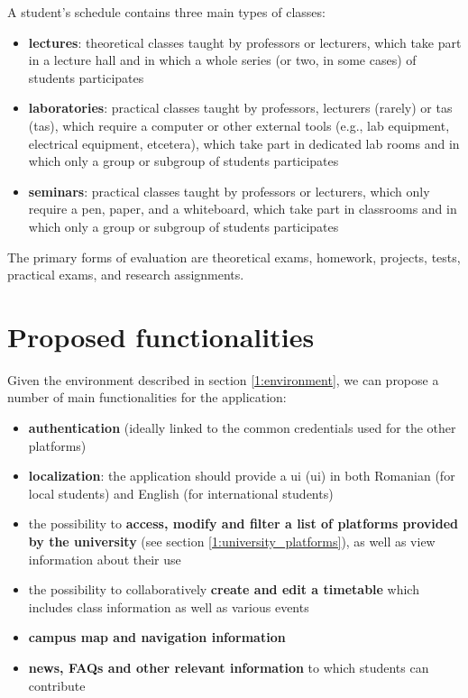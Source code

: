     A student's schedule contains three main types of classes:
    
    \begin{itemize}
        \setlength{\topsep}{0.5pt}
        \setlength{\itemsep}{0.5pt}
        \setlength{\parsep}{0.5pt}
        \item \textbf{lectures}: theoretical classes taught by professors or lecturers, which take part in a lecture hall and in which a whole series (or two, in some cases) of students participates
        \item \textbf{laboratories}: practical classes taught by professors, lecturers (rarely) or \acrshort{ta}s (\acrlong{ta}s), which require a computer or other external tools (e.g., lab equipment, electrical equipment, etcetera), which take part in dedicated lab rooms and in which only a group or subgroup of students participates
        \item \textbf{seminars}: practical classes taught by professors or lecturers, which only require a pen, paper, and a whiteboard, which take part in classrooms and in which only a group or subgroup of students participates
    \end{itemize}
    
    The primary forms of evaluation are theoretical exams, homework, projects, tests, practical exams, and research assignments.
        
\section{Proposed functionalities} \label{1:functionalities}

    Given the environment described in section \ref{1:environment}, we can propose a number of main functionalities for the application:
    
    \begin{itemize}
        \setlength{\topsep}{0.5pt}
        \setlength{\itemsep}{0.5pt}
        \setlength{\parsep}{0.5pt}
        \item \textbf{authentication} (ideally linked to the common credentials used for the other platforms)
        \item \textbf{localization}: the application should provide a \acrshort{ui} (\acrlong{ui}) in both Romanian (for local students) and English (for international students)
        \item the possibility to \textbf{access, modify and filter a list of platforms provided by the university} (see section \ref{1:university_platforms}), as well as view information about their use
        \item the possibility to collaboratively \textbf{create and edit a timetable} which includes class information as well as various events
        \item \textbf{campus map and navigation information}
        \item \textbf{news, FAQs and other relevant information} to which students can contribute
    \end{itemize}

